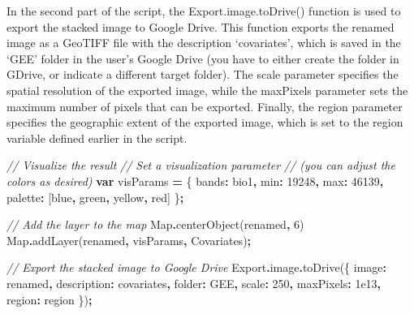 \documentclass[
  10pt,
  b5paper,
  oneside]{book}
\newenvironment{Shaded}{\begin{snugshade}}{\end{snugshade}}
\newcommand{\AttributeTok}[1]{\textcolor[rgb]{0.77,0.63,0.00}{#1}}
\newcommand{\BuiltInTok}[1]{#1}
\newcommand{\CommentTok}[1]{\textcolor[rgb]{0.56,0.35,0.01}{\textit{#1}}}
\newcommand{\DataTypeTok}[1]{\textcolor[rgb]{0.13,0.29,0.53}{#1}}
\newcommand{\DecValTok}[1]{\textcolor[rgb]{0.00,0.00,0.81}{#1}}
\newcommand{\FloatTok}[1]{\textcolor[rgb]{0.00,0.00,0.81}{#1}}
\newcommand{\FunctionTok}[1]{\textcolor[rgb]{0.00,0.00,0.00}{#1}}
\newcommand{\KeywordTok}[1]{\textcolor[rgb]{0.13,0.29,0.53}{\textbf{#1}}}
\newcommand{\NormalTok}[1]{#1}
\newcommand{\OperatorTok}[1]{\textcolor[rgb]{0.81,0.36,0.00}{\textbf{#1}}}
\newcommand{\StringTok}[1]{\textcolor[rgb]{0.31,0.60,0.02}{#1}}
\begin{document}
In the second part of the script, the Export.image.toDrive() function is used to export the stacked image to Google Drive. This function exports the renamed image as a GeoTIFF file with the description `covariates', which is saved in the `GEE' folder in the user's Google Drive (you have to either create the folder in GDrive, or indicate a different target folder). The scale parameter specifies the spatial resolution of the exported image, while the maxPixels parameter sets the maximum number of pixels that can be exported. Finally, the region parameter specifies the geographic extent of the exported image, which is set to the region variable defined earlier in the script.

\begin{Shaded}
\begin{Highlighting}[]
\CommentTok{// Visualize the result}
\CommentTok{// Set a visualization parameter }
\CommentTok{// (you can adjust the colors as desired)}
\KeywordTok{var}\NormalTok{ visParams }\OperatorTok{=}\NormalTok{ \{}
  \DataTypeTok{bands}\OperatorTok{:} \StringTok{\textquotesingle{}bio1\textquotesingle{}}\OperatorTok{,}
  \DataTypeTok{min}\OperatorTok{:} \DecValTok{19248}\OperatorTok{,}
  \DataTypeTok{max}\OperatorTok{:} \DecValTok{46139}\OperatorTok{,}
  \DataTypeTok{palette}\OperatorTok{:}\NormalTok{ [}\StringTok{\textquotesingle{}blue\textquotesingle{}}\OperatorTok{,} \StringTok{\textquotesingle{}green\textquotesingle{}}\OperatorTok{,} \StringTok{\textquotesingle{}yellow\textquotesingle{}}\OperatorTok{,} \StringTok{\textquotesingle{}red\textquotesingle{}}\NormalTok{]}
\NormalTok{\}}\OperatorTok{;}

\CommentTok{// Add the layer to the map}
\BuiltInTok{Map}\OperatorTok{.}\FunctionTok{centerObject}\NormalTok{(renamed}\OperatorTok{,} \DecValTok{6}\NormalTok{)}
\BuiltInTok{Map}\OperatorTok{.}\FunctionTok{addLayer}\NormalTok{(renamed}\OperatorTok{,}\NormalTok{ visParams}\OperatorTok{,} \StringTok{\textquotesingle{}Covariates\textquotesingle{}}\NormalTok{)}\OperatorTok{;}


\CommentTok{// Export the stacked image to Google Drive}
\NormalTok{Export}\OperatorTok{.}\AttributeTok{image}\OperatorTok{.}\FunctionTok{toDrive}\NormalTok{(\{}
  \DataTypeTok{image}\OperatorTok{:}\NormalTok{ renamed}\OperatorTok{,}
  \DataTypeTok{description}\OperatorTok{:} \StringTok{\textquotesingle{}covariates\textquotesingle{}}\OperatorTok{,}
  \DataTypeTok{folder}\OperatorTok{:} \StringTok{\textquotesingle{}GEE\textquotesingle{}}\OperatorTok{,}
  \DataTypeTok{scale}\OperatorTok{:} \DecValTok{250}\OperatorTok{,}
  \DataTypeTok{maxPixels}\OperatorTok{:} \FloatTok{1e13}\OperatorTok{,}
  \DataTypeTok{region}\OperatorTok{:}\NormalTok{ region}
\NormalTok{\})}\OperatorTok{;}
\end{Highlighting}
\end{Shaded}
\end{document}
